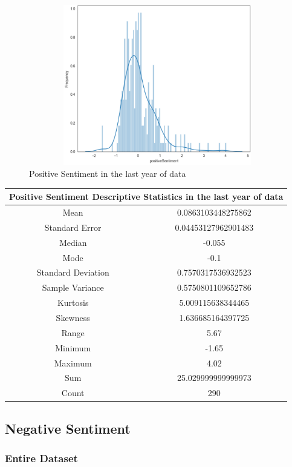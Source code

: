 \begin{figure}[h!]
    \centering
    \includegraphics[width=15cm,height=7cm,keepaspectratio]{resultsEvaluation/positiveDesc1.png}
    \caption{Positive Sentiment in the last year of data}
    \label{fig:appendix_positiveDesc1}
\end{figure}
\begin{center}
\begin{tabular}{ c c }
\hline
\multicolumn{2}{|c|}{Positive Sentiment Descriptive Statistics in the last year of data} \\
\hline
Mean & 0.0863103448275862 \\
Standard Error & 0.04453127962901483 \\
Median & -0.055 \\
Mode & -0.1 \\
Standard Deviation & 0.7570317536932523 \\
Sample Variance & 0.5750801109652786 \\
Kurtosis & 5.009115638344465 \\
Skewness & 1.636685164397725 \\
Range & 5.67 \\
Minimum & -1.65 \\
Maximum & 4.02 \\
Sum & 25.029999999999973 \\
Count & 290
\end{tabular}
\end{center}

\subsection{Negative Sentiment}

\subsubsection{Entire Dataset}

